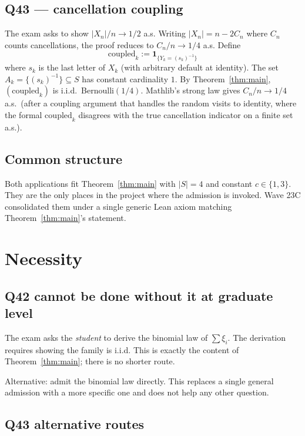 \documentclass[11pt,a4paper]{article}
\newcommand{\one}{\mathbf{1}}
\theoremstyle{plain}
\theoremstyle{definition}
\theoremstyle{remark}
\begin{document}
\subsection{Q43 --- cancellation coupling}

The exam asks to show $|X_n|/n \to 1/2$ a.s. Writing $|X_n| = n - 2
C_n$ where $C_n$ counts cancellations, the proof reduces to $C_n/n
\to 1/4$ a.s. Define
\[
  \mathrm{coupled}_k := \one_{\{Y_k = (s_k)^{-1}\}}
\]
where $s_k$ is the last letter of $X_k$ (with arbitrary default at
identity). The set $A_k = \{(s_k)^{-1}\} \subseteq S$ has constant
cardinality $1$. By Theorem~\ref{thm:main}, $(\mathrm{coupled}_k)$ is
i.i.d.\ Bernoulli$(1/4)$. Mathlib's strong law gives $C_n/n \to 1/4$
a.s.\ (after a coupling argument that handles the random visits to
identity, where the formal $\mathrm{coupled}_k$ disagrees with the
true cancellation indicator on a finite set a.s.).

\subsection{Common structure}

Both applications fit Theorem~\ref{thm:main} with $|S| = 4$ and
constant $c \in \{1, 3\}$. They are the only places in the project
where the admission is invoked. Wave 23C consolidated them under a
single generic Lean axiom matching Theorem~\ref{thm:main}'s
statement.

\section{Necessity}

\subsection{Q42 cannot be done without it at graduate level}

The exam asks the \emph{student} to derive the binomial law of
$\sum \xi_i$. The derivation requires showing the family is i.i.d.
This is exactly the content of Theorem~\ref{thm:main}; there is no
shorter route.

Alternative: admit the binomial law directly. This replaces a single
general admission with a more specific one and does not help any
other question.

\subsection{Q43 alternative routes}
\end{document}
